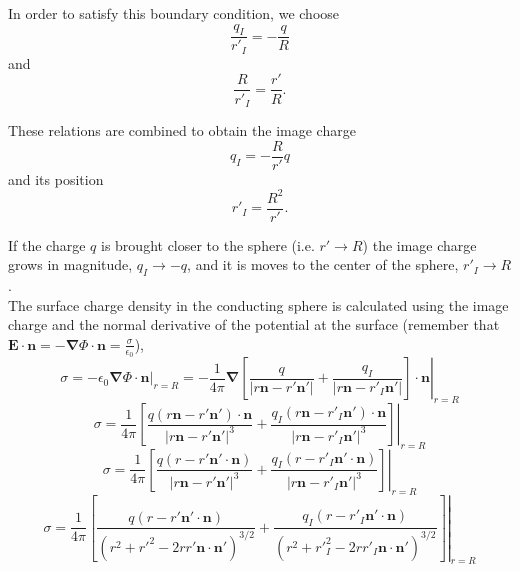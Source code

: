 In order to satisfy this boundary condition, we choose
\begin{equation}
\frac{q_I}{r'_I} = -\frac{q}{R} 
\end{equation}
and
\begin{equation}
\frac{R}{r'_I} = \frac{r'}{R}.
\end{equation}

These relations are combined to obtain the image charge
\begin{equation}
 q_I = -\frac{R}{r'} q \label{ImageCharge01}
 \end{equation}
and its position
\begin{equation}
r'_I = \frac{R^2}{r'}.  \label{ImageChargePosition01}
\end{equation}

If the charge $q$ is brought closer to the sphere (i.e. $r' \rightarrow R$) the image charge grows in magnitude, $q_I \rightarrow -q$, and it is moves to the center of the sphere, $r'_I \rightarrow R$. \\
The surface charge density in the conducting sphere is calculated using the image charge and the normal derivative of the potential at the surface (remember that $ \textbf{E}  \cdot \textbf{n}= -\boldsymbol{\nabla} \Phi \cdot \textbf{n} = \frac{\sigma}{\epsilon_0}$),
\begin{equation}
 \sigma = -\epsilon_0 \left. \boldsymbol{\nabla} \Phi \cdot \textbf{n}  \right|_{r=R} = - \frac{1}{4 \pi } \left. \boldsymbol{\nabla} \left[  \frac{q}{\left| r \textbf{n} - r' \textbf{n}' \right|} + \frac{q_I}{\left| r \textbf{n} - r'_I \textbf{n}' \right|} \right] \cdot \textbf{n}  \right|_{r=R}   
 \end{equation} 
\begin{equation}
 \sigma =  \frac{1}{4 \pi } \left. \left[  \frac{q (r \textbf{n} - r' \textbf{n}' ) \cdot \textbf{n} }{\left| r \textbf{n} - r' \textbf{n}' \right|^3 } + \frac{q_I (r \textbf{n} - r'_I \textbf{n}')\cdot \textbf{n} }{\left| r \textbf{n} - r'_I \textbf{n}' \right|^3} \right]  \right|_{r=R}   
 \end{equation} 
\begin{equation}
 \sigma =  \frac{1}{4 \pi } \left. \left[  \frac{q (r  - r' \textbf{n}' \cdot \textbf{n})  }{\left| r \textbf{n} - r' \textbf{n}' \right|^3 } + \frac{q_I (r  - r'_I \textbf{n}'\cdot \textbf{n}) }{\left| r \textbf{n} - r'_I \textbf{n}' \right|^3} \right]  \right|_{r=R}   
 \end{equation}  
 \begin{equation}
 \sigma =  \frac{1}{4 \pi } \left. \left[  \frac{q (r  - r' \textbf{n}' \cdot \textbf{n}) }{\left(r^2 + r'^2 - 2 rr' \textbf{n} \cdot \textbf{n}' \right)^{3/2} } + \frac{q_I (r  - r'_I \textbf{n}'\cdot \textbf{n}) }{\left(r^2 + r'^2_I - 2 rr'_I \textbf{n} \cdot \textbf{n}' \right)^{3/2}} \right]  \right|_{r=R}   
 \end{equation} 
